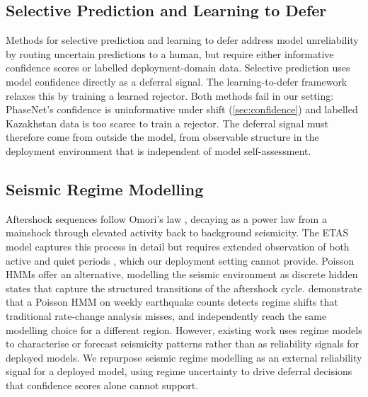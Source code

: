 \subsection{Selective Prediction and Learning to Defer}
\label{sec:bg_defer}

Methods for selective prediction and learning to defer address model unreliability by routing uncertain predictions to a human, but require either informative confidence scores or labelled deployment-domain data. Selective prediction \citep{chow1970optimum, geifman2017selective} uses model confidence directly as a deferral signal. The learning-to-defer framework \citep{madras2018predict, mozannar2020consistent} relaxes this by training a learned rejector. Both methods fail in our setting: PhaseNet's confidence is uninformative under shift (\cref{sec:confidence}) and labelled Kazakhstan data is too scarce to train a rejector. The deferral signal must therefore come from outside the model, from observable structure in the deployment environment that is independent of model self-assessment.

\subsection{Seismic Regime Modelling}
\label{sec:bg_regime}

Aftershock sequences follow Omori's law \citep{omori1894aftershocks, utsu1995centenary}, decaying as a power law from a mainshock through elevated activity back to background seismicity. The ETAS model \citep{ogata1988etas} captures this process in detail but requires extended observation of both active and quiet periods \citep{naylor2023bayesian}, which our deployment setting cannot provide. Poisson HMMs offer an alternative, modelling the seismic environment as discrete hidden states that capture the structured transitions of the aftershock cycle. \citet{orfanogiannaki2010poisson} demonstrate that a Poisson HMM on weekly earthquake counts detects regime shifts that traditional rate-change analysis misses, and \citet{felix2022poisson} independently reach the 
same modelling choice for a different region. However, existing work uses regime models to characterise or forecast seismicity patterns rather than as reliability signals for deployed models. We repurpose seismic regime modelling as an external reliability signal for a deployed model, using regime uncertainty to drive deferral decisions that confidence scores alone cannot support.
